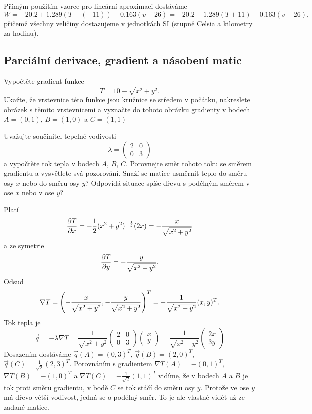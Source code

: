 \reseni

Přímým použitím vzorce pro lineární aproximaci dostáváme
\begin{dmath*}
W=-20.2+1.289(T-(-11))-0.163(v-26)=-20.2+1.289(T+11)-0.163(v-26),
\end{dmath*}
přičemž všechny veličiny dostazujeme v jednotkách SI (stupně Celsia a kilometry za hodinu).

\konec



\subsection{Parciální derivace, gradient a násobení matic}

Vypočtěte gradient funkce $$T=10-\sqrt{x^2+y^2}.$$ Ukažte, že vrstevnice
této funkce jsou kružnice se středem v počátku, nakreslete obrázek s
těmito vrstevnicemi a vyznačte do tohoto obrázku gradienty v bodech
$A=(0,1)$, $B=(1,0)$ a $C=(1,1)$

Uvažujte součinitel tepelné vodivosti $$\lambda =
\begin{pmatrix}
  2&0\\0&3
\end{pmatrix}$$
a vypočtěte tok tepla v bodech $A$, $B$, $C$. Porovnejte směr tohoto toku se směrem gradientu a vysvětlete svá pozorování. Snaží se matice usměrnit teplo do  směru osy $x$ nebo do  směru osy $y$? Odpovídá situace spíše dřevu s podélným směrem v ose $x$ nebo v ose $y$?


\reseni

Platí $$\pdv{T}{x}=-\frac 12 (x^2+y^2)^{-\frac 12}(2x)=-\frac{x}{\sqrt{x^2+y^2}}$$
a ze symetrie 
$$\pdv{T}{y}=-\frac{y}{\sqrt{x^2+y^2}}.$$
Odsud $$\nabla T=\qty(-\frac{x}{\sqrt{x^2+y^2}},-\frac{y}{\sqrt{x^2+y^2}})^T
=
-\frac 1{\sqrt{x^2+y^2}}(x,y)^T.$$
Tok tepla je
$$\vec q=-\lambda \nabla T=\frac 1{\sqrt{x^2+y^2}}\begin{pmatrix}
  2&0\\0&3
\end{pmatrix}
\begin{pmatrix}
  x\\y
\end{pmatrix}
=\frac 1{\sqrt{x^2+y^2}} \begin{pmatrix}
  2x\\3y
\end{pmatrix}
$$
Dosazením dostáváme $\vec q(A)=(0,3)^T$, $\vec q(B)=(2,0)^T$, $\vec q(C)=\frac 1{\sqrt{2}}(2,3)^T$. Porovnáním s gradientem $\nabla T(A)=-(0,1)^T$, $\nabla T(B)=-(1,0)^T$ a $\nabla T(C)=-\frac 1{\sqrt 2}(1,1)^T$ vidíme, že v bodech $A$  a $B$ je tok proti směru gradientu, v bodě $C$ se tok stáčí do směru osy $y$. Protože ve ose $y$ má dřevo větší vodivost, jedná se o podélný směr. To je ale vlastně vidět už ze zadané matice.

